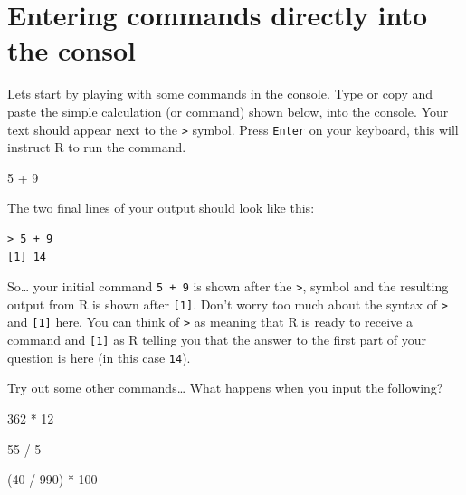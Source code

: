 \documentclass[
]{book}
\newenvironment{Shaded}{\begin{snugshade}}{\end{snugshade}}
\newcommand{\DecValTok}[1]{\textcolor[rgb]{0.00,0.00,0.81}{#1}}
\newcommand{\NormalTok}[1]{#1}
\newcommand{\SpecialCharTok}[1]{\textcolor[rgb]{0.00,0.00,0.00}{#1}}
\begin{document}
\hypertarget{entering-commands-directly-into-the-consol}{%
\section{Entering commands directly into the consol}\label{entering-commands-directly-into-the-consol}}

Lets start by playing with some commands in the console. Type or copy and paste the simple calculation (or command) shown below, into the console. Your text should appear next to the \texttt{\textgreater{}} symbol. Press \texttt{Enter} on your keyboard, this will instruct R to run the command.

\begin{Shaded}
\begin{Highlighting}[]
\DecValTok{5} \SpecialCharTok{+} \DecValTok{9}
\end{Highlighting}
\end{Shaded}

The two final lines of your output should look like this:

\begin{verbatim}
> 5 + 9
[1] 14
\end{verbatim}

So\ldots{} your initial command \texttt{5\ +\ 9} is shown after the \texttt{\textgreater{}}, symbol and the resulting output from R is shown after \texttt{{[}1{]}}. Don't worry too much about the syntax of \texttt{\textgreater{}} and \texttt{{[}1{]}} here. You can think of \texttt{\textgreater{}} as meaning that R is ready to receive a command and \texttt{{[}1{]}} as R telling you that the answer to the first part of your question is here (in this case \texttt{14}).

Try out some other commands\ldots{} What happens when you input the following?

\begin{Shaded}
\begin{Highlighting}[]
\DecValTok{362} \SpecialCharTok{*} \DecValTok{12}
\end{Highlighting}
\end{Shaded}

\begin{Shaded}
\begin{Highlighting}[]
\DecValTok{55} \SpecialCharTok{/} \DecValTok{5}
\end{Highlighting}
\end{Shaded}

\begin{Shaded}
\begin{Highlighting}[]
\NormalTok{(}\DecValTok{40} \SpecialCharTok{/} \DecValTok{990}\NormalTok{) }\SpecialCharTok{*} \DecValTok{100}
\end{Highlighting}
\end{Shaded}
\end{document}
